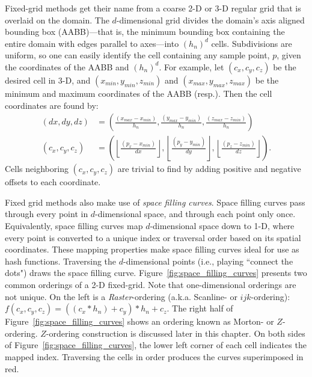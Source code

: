 \documentclass{report}
\begin{document}
Fixed-grid methods get their name from a coarse 2-D or 3-D regular grid that is overlaid on the domain. The $d$-dimensional grid divides the domain's axis aligned bounding box (AABB)---that is, the minimum bounding box containing the entire domain with edges parallel to axes---into $(h_n)^d$ cells. Subdivisions are uniform, so one can easily identify the cell containing any sample point, $p$, given the coordinates of the AABB and $(h_n)^d$. For example, let $(c_x, c_y, c_z)$ be the desired cell in 3-D, and $(x_{min}, y_{min}, z_{min})$ and $(x_{max}, y_{max}, z_{max})$ be the minimum and maximum coordinates of the AABB (resp.). Then the cell coordinates are found by:  
\begin{align}
(dx, dy, dz) & = \left(\frac{(x_{max} - x_{min})}{h_n}, \frac{(y_{max} - y_{min})}{h_n}, \frac{(z_{max} - z_{min})}{h_n}\right) \nonumber \\
(c_x, c_y, c_z) & = \left(\left\lfloor\frac{(p_x - x_{min})}{dx}\right\rfloor , \left\lfloor\frac{(p_y - y_{min})}{dy}\right\rfloor , \left\lfloor\frac{(p_z - z_{min})}{dz}\right\rfloor \right).
\label{eq:cell_hash}
\end{align}
Cells neighboring $(c_x, c_y, c_z)$ are trivial to find by adding positive and negative offsets to each coordinate. %

Fixed grid methods also make use of \emph{space filling curves}. Space filling curves pass through every point in $d$-dimensional space, and through each point only once. Equivalently, space filling curves map $d$-dimensional space down to 1-D, where every point is converted to a unique index or traversal order based on its spatial coordinates. These mapping properties make space filling curves ideal for use as hash functions. Traversing the $d$-dimensional points (i.e., playing ``connect the dots") draws the space filling curve. Figure~\ref{fig:space_filling_curves} presents two common orderings of a 2-D fixed-grid. Note that one-dimensional orderings are not unique. On the left is a \emph{Raster}-ordering (a.k.a. Scanline- or $ijk$-ordering): $f(c_x,c_y,c_z) = ((c_x * h_n) + c_y) * h_n + c_z$. The right half of Figure~\ref{fig:space_filling_curves} shows an ordering known as Morton- or $Z$-ordering. $Z$-ordering construction is discussed later in this chapter. On both sides of Figure~\ref{fig:space_filling_curves}, the lower left corner of each cell indicates the mapped index. Traversing the cells in order produces the curves superimposed in red. 
\end{document}
